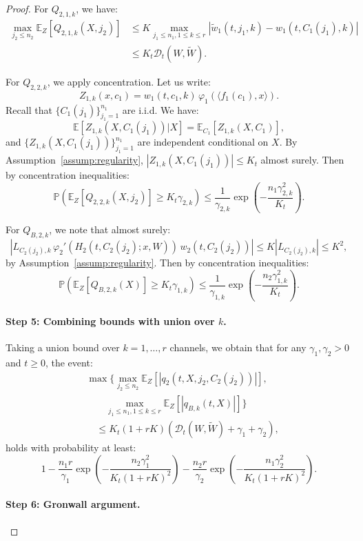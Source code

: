 \begin{proof}
For $Q_{2,1,k}$, we have:
\begin{align*}
\max_{j_2 \le n_2}\mathbb{E}_Z[Q_{2,1,k}(X, j_2)] &\le K\max_{j_1 \le n_1, 1 \le k \le r}|\tilde{w}_1(t, j_1, k) - w_1(t, C_1(j_1), k)|\\
&\le K_t\mathscr{D}_t(W, \tilde{W}).
\end{align*}

For $Q_{2,2,k}$, we apply concentration. Let us write:
\[
Z_{1,k}(x, c_1) = w_1(t, c_1, k)\,\varphi_1(\langle f_1(c_1), x\rangle).
\]
Recall that $\{C_1(j_1)\}_{j_1=1}^{n_1}$ are i.i.d. We have:
\[
\mathbb{E}[Z_{1,k}(X, C_1(j_1))|X] = \mathbb{E}_{C_1}[Z_{1,k}(X, C_1)],
\]
and $\{Z_{1,k}(X, C_1(j_1))\}_{j_1=1}^{n_1}$ are independent conditional on $X$. By Assumption~\ref{assump:regularity}, $|Z_{1,k}(X, C_1(j_1))| \le K_t$ almost surely. Then by concentration inequalities:
\[
\mathbb{P}\left(\mathbb{E}_Z[Q_{2,2,k}(X, j_2)] \ge K_t\gamma_{2,k}\right) \le \frac{1}{\gamma_{2,k}}\exp\left(-\frac{n_1\gamma_{2,k}^2}{K_t}\right).
\]

For $Q_{B,2,k}$, we note that almost surely:
\[
|L_{C_2(j_2),k}\,\varphi_2'(H_2(t, C_2(j_2); x, W))\,w_2(t, C_2(j_2))| \le K|L_{C_2(j_2),k}| \le K^2,
\]
by Assumption~\ref{assump:regularity}. Then by concentration inequalities:
\[
\mathbb{P}\left(\mathbb{E}_Z[Q_{B,2,k}(X)] \ge K_t\gamma_{1,k}\right) \le \frac{1}{\gamma_{1,k}}\exp\left(-\frac{n_2\gamma_{1,k}^2}{K_t}\right).
\]

\paragraph*{Step 5: Combining bounds with union over $k$.}

Taking a union bound over $k = 1, \ldots, r$ channels, we obtain that for any $\gamma_1, \gamma_2 > 0$ and $t \ge 0$, the event:
\begin{align*}
&\max\Bigg\{\max_{j_2 \le n_2}\mathbb{E}_Z[|q_2(t, X, j_2, C_2(j_2))|],\\
&\qquad\max_{j_1 \le n_1, 1 \le k \le r}\mathbb{E}_Z[|q_{B,k}(t, X)|]\Bigg\}\\
&\quad \le K_t(1+rK)(\mathscr{D}_t(W, \tilde{W}) + \gamma_1 + \gamma_2),
\end{align*}
holds with probability at least:
\[
1 - \frac{n_1r}{\gamma_1}\exp\left(-\frac{n_2\gamma_1^2}{K_t(1+rK)^2}\right) - \frac{n_2r}{\gamma_2}\exp\left(-\frac{n_1\gamma_2^2}{K_t(1+rK)^2}\right).
\]

\paragraph*{Step 6: Gronwall argument.}


\end{proof}
